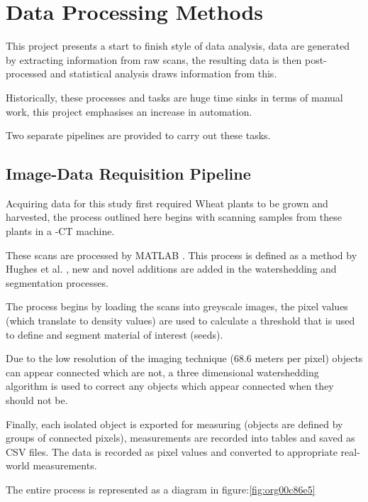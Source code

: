 \documentclass[11pt]{report}
\begin{document}
\section{Data Processing Methods}
\label{sec:org42efe4d}
This project presents a start to finish style of data analysis, data are generated by extracting information from raw scans, the resulting data is then post-processed and statistical analysis draws information from this.

Historically, these processes and tasks are huge time sinks in terms of manual work, this project emphasises an increase in automation.

Two separate pipelines are provided to carry out these tasks.

\subsection{Image-Data Requisition Pipeline}
\label{sec:orgfdc4baf}

Acquiring data for this study first required Wheat plants to be grown and harvested, the process outlined here begins with scanning samples from these plants in a \textmu{}-CT machine.

These scans are processed by MATLAB \cite{MATHWORKS2017}. This process is defined as a method by Hughes et al. \cite{Hughes2017}, new and novel additions are added in the watershedding and segmentation processes.

The process begins by loading the scans into greyscale images, the pixel values (which translate to density values) are used to calculate a threshold that is used to define and segment material of interest (seeds).

Due to the low resolution of the imaging technique (68.6\textmu{} meters per pixel) objects can appear connected which are not, a three dimensional watershedding algorithm is used to correct any objects which appear connected when they should not be.

Finally, each isolated object is exported for measuring (objects are defined by groups of connected pixels), measurements are recorded into tables and saved as CSV files. The data is recorded as pixel values and converted to appropriate real-world measurements.

The entire process is represented as a diagram in figure:\ref{fig:org00c86e5}
\end{document}
